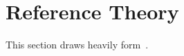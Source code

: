 
\section{Reference Theory}
\label{sec:ref-theory}
This section draws heavily form~\cite{roisin2010GFD}.








